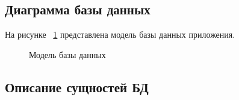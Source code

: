 \documentclass[a4paper]{article}
\begin{document}
\subsection{Диаграмма базы данных}

На рисунке ~\ref{fig:image19} представлена модель базы данных приложения.

\begin{figure}[h]
\caption{Модель базы данных}
\label{fig:image19}
\end{figure}

\subsection{Описание сущностей БД}
\end{document}
